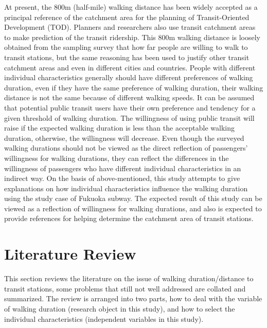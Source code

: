\documentclass[Journal,letterpaper]{ascelike-new}
\begin{document}
%
At present, the 800m (half-mile) walking distance has been widely accepted as a principal reference of the catchment area for the planning of Transit-Oriented Development (TOD). Planners and researchers also use transit catchment areas to make prediction of the transit ridership. This 800m walking distance is loosely obtained from the sampling survey that how far people are willing to walk to transit stations, but the same reasoning has been used to justify other transit catchment areas and even in different cities and countries. People with different individual characteristics generally should have different preferences of walking duration, even if they have the same preference of walking duration, their walking distance is not the same because of different walking speeds. It can be assumed that potential public transit users have their own preference and tendency for a given threshold of walking duration. The willingness of using public transit will raise if the expected walking duration is less than the acceptable walking duration, otherwise, the willingness will decrease. Even though the surveyed walking durations should not be viewed as the direct reflection of passengers' willingness for walking durations, they can reflect the differences in the willingness of passengers who have different individual characteristics in an indirect way. On the basis of above-mentioned, this study attempts to give explanations on how individual characteristics influence the walking duration using the study case of Fukuoka subway. The expected result of this study can be viewed as a reflection of willingness for walking durations, and also is expected to provide references for helping determine the catchment area of transit stations.

%
\section{Literature Review}
This section reviews the literature on the issue of walking duration/distance to transit stations, some problems that still not well addressed are collated and summarized. The review is arranged into two parts, how to deal with the variable of walking duration (research object in this study), and how to select the individual characteristics (independent variables in this study).
\end{document}
